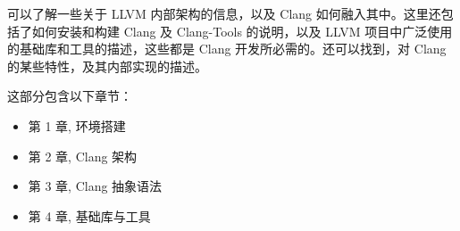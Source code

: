 

可以了解一些关于 LLVM 内部架构的信息，以及 Clang 如何融入其中。这里还包括了如何安装和构建 Clang 及 Clang-Tools 的说明，以及 LLVM 项目中广泛使用的基础库和工具的描述，这些都是 Clang 开发所必需的。还可以找到，对 Clang 的某些特性，及其内部实现的描述。

这部分包含以下章节：

\begin{itemize}
\item
第 1 章, 环境搭建

\item
第 2 章, Clang 架构

\item
第 3 章, Clang 抽象语法

\item
第 4 章, 基础库与工具
\end{itemize}
